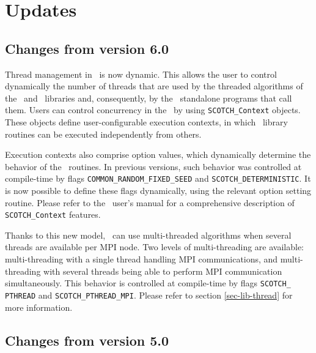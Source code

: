 
\section{Updates}
\label{sec-changes}

\subsection{Changes from version 6.0}

Thread management in \scotch\ is now dynamic. This allows the user to
control dynamically the number of threads that are used by the
threaded algorithms of the \libptscotch\ and \libscotch\ libraries
and, consequently, by the \ptscotch\ standalone programs that call
them. Users can control concurrency in the \libptscotch\ by using
\texttt{SCOTCH\_\lbt Context} objects. These objects define
user-configurable execution contexts, in which \libptscotch\ library
routines can be executed independently from others.

Execution contexts also comprise option values, which dynamically
determine the behavior of the \scotch\ routines. In previous versions,
such behavior was controlled at compile-time by flags
\texttt{COMMON\_\lbt RANDOM\_\lbt FIXED\_\lbt SEED} and
\texttt{SCOTCH\_\lbt DETERMINISTIC}. It is now possible to define
these flags dynamically, using the relevant option setting routine.
Please refer to the \scotch\ user's manual for a comprehensive
description of \texttt{SCOTCH\_\lbt Context} features.

Thanks to this new model, \ptscotch\ can use multi-threaded
algorithms when several threads are available per MPI node. Two
levels of multi-threading are available: multi-threading with a single
thread handling MPI communications, and multi-threading with several
threads being able to perform MPI communication simultaneously. This
behavior is controlled at compile-time by flags \texttt{SCOTCH\_\lbt
PTHREAD} and \texttt{SCOTCH\_\lbt PTHREAD\_\lbt MPI}.
Please refer to section \ref{sec-lib-thread} for more information.
  
\subsection{Changes from version 5.0}

